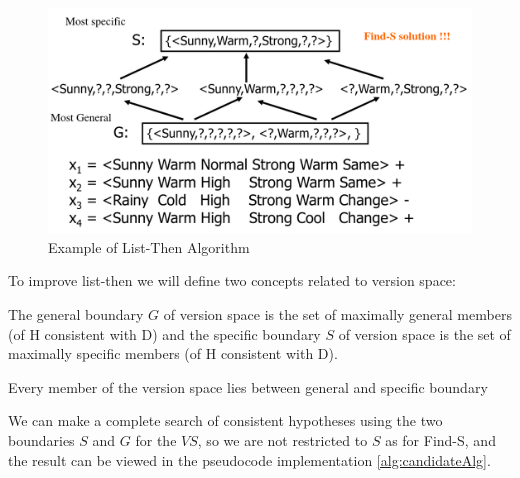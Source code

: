\begin{figure}
	\caption{Example of List-Then Algorithm}
	\label{img:list-then}
	\includegraphics[width=\textwidth]{images/list-then-example}
\end{figure}
To improve list-then we will define two concepts related to version space:
\begin{defi}
The general boundary $G$ of version space is the set of maximally general members (of H consistent with D) and the specific boundary $S$ of version space 
is the set of maximally specific members (of H consistent with D).
\end{defi}

\begin{thm}
	Every member of the version space lies between general and specific boundary
\end{thm}
We can make a complete search of consistent hypotheses using the two boundaries $S$ and $G$ for the $VS$, so we are not restricted to $S$ as for Find-S, and the result can be viewed
in the pseudocode implementation \ref{alg:candidateAlg}.

